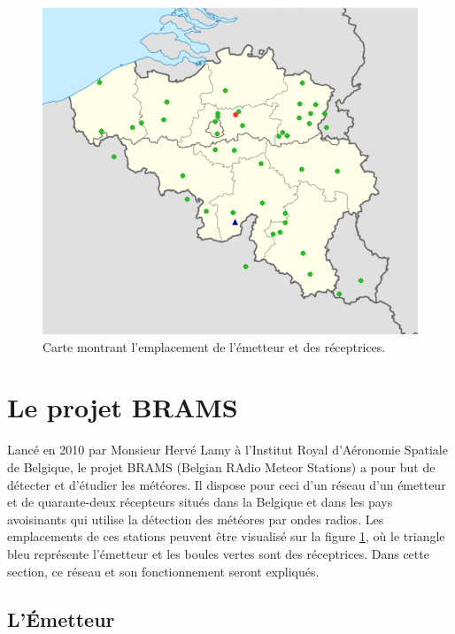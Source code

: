 \documentclass[11pt]{article}
\begin{document}
\begin{figure}[t]
    \begin{center}
        \includegraphics[scale=0.5]{station_map.png}
        \caption{Carte montrant l'emplacement de l'émetteur et des réceptrices.}
        \label{fig:station_map}
    \end{center}
\end{figure}

\section{Le projet BRAMS}

Lancé en 2010 par Monsieur Hervé Lamy à l'Institut Royal d'Aéronomie Spatiale de Belgique, le projet BRAMS (Belgian RAdio Meteor Stations) a pour but de détecter et d'étudier les météores.
Il dispose pour ceci d'un réseau d'un émetteur et de quarante-deux récepteurs situés dans la Belgique et dans les pays avoisinants qui utilise la détection des météores par ondes radios.
Les emplacements de ces stations peuvent être visualisé sur la figure \ref{fig:station_map}, où le triangle bleu représente l'émetteur et les boules vertes sont des réceptrices.
Dans cette section, ce réseau et son fonctionnement seront expliqués.

\subsection{L'Émetteur}
\end{document}

